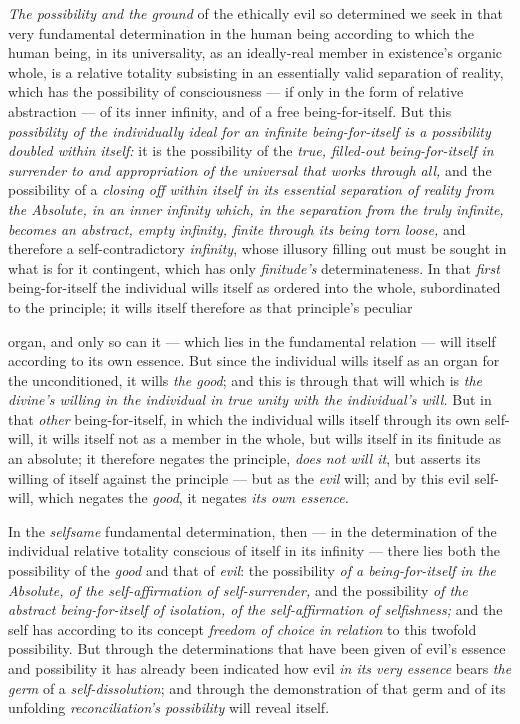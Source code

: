 \documentclass[12pt,a4paper]{book}
\begin{document}
\emph{The possibility and the ground} of the ethically evil so determined we
seek in that very fundamental determination in the human being according to
which the human being, in its universality, as an ideally-real member in
existence's organic whole, is a relative totality subsisting in an essentially
valid separation of reality, which has the possibility of consciousness --- if
only in the form of relative abstraction --- of its inner infinity, and of a
free being-for-itself. But this \emph{possibility of the individually ideal for
an infinite being-for-itself is a possibility doubled within itself:} it is the
possibility of the \emph{true, filled-out being-for-itself in surrender to and
appropriation of the universal that works through all,} and the possibility of a
\emph{closing off within itself in its essential separation of reality from the
Absolute, in an inner infinity which, in the separation from the truly infinite,
becomes an abstract, empty infinity, finite through its being torn loose,} and
therefore a self-contradictory \emph{infinity}, whose illusory filling out must
be sought in what is for it contingent, which has only \emph{finitude's}
determinateness. In that \emph{first} being-for-itself the individual wills
itself as ordered into the whole, subordinated to the principle; it wills itself
therefore as that principle's peculiar

organ, and only so can it --- which lies in the fundamental relation --- will
itself according to its own essence. But since
the individual wills itself as an organ for the unconditioned, it wills
\emph{the good}; and this is through that will which is \emph{the divine's
willing in the individual in true unity with the individual's will.} But in that
\emph{other} being-for-itself, in which the individual wills itself through its
own self-will, it wills itself not as a member in the whole, but wills itself in
its finitude as an absolute; it therefore negates the principle, \emph{does not
will it}, but asserts its willing of itself against the principle --- but as the
\emph{evil} will; and by this evil self-will, which negates the \emph{good}, it
negates \emph{its own essence.}

In the \emph{selfsame} fundamental determination, then --- in the determination
of the individual relative totality conscious of itself in its infinity ---
there lies both the possibility of the \emph{good} and that of \emph{evil}: the
possibility \emph{of a being-for-itself in the Absolute, of the
self-affirmation of self-surrender,} and the possibility \emph{of the abstract
being-for-itself of isolation, of the self-affirmation of selfishness;} and the
self has according to its concept \emph{freedom of choice in relation} to this
twofold possibility. But through the determinations that have been given of
evil's essence and possibility it has already been indicated how evil \emph{in
its very essence} bears \emph{the germ} of a \emph{self-dissolution}; and
through the demonstration of that germ and of its unfolding
\emph{reconciliation's possibility} will reveal itself.
\end{document}
